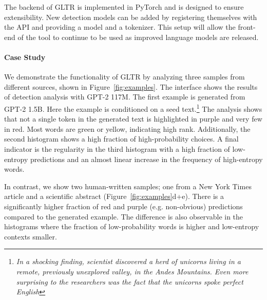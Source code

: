 \documentclass[11pt,a4paper]{article}
\begin{document}
The backend of GLTR is implemented in PyTorch and is designed to ensure extensibility. New detection models can be added by registering themselves with the API and providing a model and a tokenizer. This setup will allow the front-end of the  tool to continue to be used as improved language models are released.


\paragraph{Case Study}

We demonstrate the functionality of GLTR by analyzing three samples from different sources, shown in Figure~\ref{fig:examples}. The interface shows the results of detection analysis with GPT-2 117M. The first example is generated from GPT-2 1.5B.
Here the example is conditioned on a seed text.\footnote{\textit{In a shocking finding, scientist discovered a herd of unicorns living in a remote, previously unexplored valley, in the Andes Mountains. Even more surprising to the researchers was the fact that the unicorns spoke perfect English}} The analysis shows that not a single token in the generated text is highlighted in purple and very few in red. Most words are green or yellow, indicating high rank. Additionally, the second histogram shows a high fraction of high-probability choices. A final indicator is the regularity in the third histogram with a high fraction of low-entropy predictions and an almost linear increase in the frequency of high-entropy words.

In contrast, we show two human-written samples; one from a New York Times article and a scientific abstract (Figure~\ref{fig:examples}d+e). There is a significantly higher fraction of red and purple (e.g. non-obvious) predictions compared to the generated example. The difference is also observable in the histograms where the fraction of low-probability words is higher and low-entropy contexts smaller.
\end{document}
